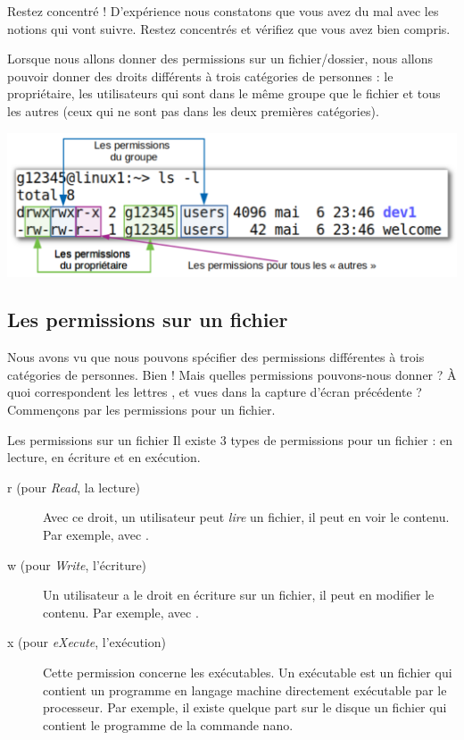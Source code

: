 \documentclass[a4paper,11pt]{style-esi/td}
\begin{document}
		\begin{alerttbox}{Restez concentré !} 
			D'expérience nous constatons que vous avez du mal avec 
			les notions qui vont suivre.
			Restez concentrés et vérifiez que vous avez bien compris.
		\end{alerttbox}
		
		Lorsque nous allons donner des permissions sur un fichier/dossier,
		nous allons pouvoir donner des droits différents à trois catégories
		de personnes : le propriétaire, les utilisateurs qui sont dans le même
		groupe que le fichier et tous les \og{}autres\fg{} 
		(ceux qui ne sont pas dans les deux premières catégories).

		\begin{center}
			\includegraphics[width=.8\textwidth]{image/categorie}
		\end{center}

    \subsection{Les permissions sur un fichier}  

		Nous avons vu que nous pouvons spécifier des permissions différentes
		à trois catégories de personnes.
		Bien ! Mais quelles permissions pouvons-nous donner ?
		À quoi correspondent les lettres ,  et 
		vues dans la capture d'écran précédente ?
		Commençons par les permissions pour un fichier.

		\begin{theorie}{Les permissions sur un fichier}
			Il existe 3 types de permissions pour un fichier : 
			en lecture, en écriture et en exécution.
			\begin{description}
			\item[r (pour \emph{Read}, la lecture)] 
				Avec ce droit, un utilisateur peut 
				\emph{lire} un fichier, il peut en voir le contenu. 
				Par exemple, avec .
			\item[w (pour \emph{Write}, l'écriture)]
				Un utilisateur a le droit en écriture sur un fichier, 
				il peut en modifier le contenu. 
				Par exemple, avec .
			\item[x (pour \emph{eXecute}, l'exécution)]
				Cette permission concerne les exécutables. 
				Un exécutable est un fichier qui contient 
				un programme en langage machine 
				directement exécutable par le processeur.
				Par exemple, il existe quelque part sur le disque 
				un fichier  
				qui contient le programme de la commande nano.
			\end{description}
		\end{theorie}
\end{document}
